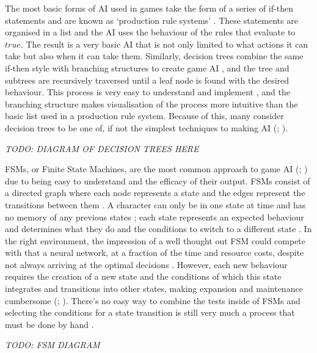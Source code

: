 \documentclass[11pt, a4paper]{article}
\begin{document}
The most basic forms of AI used in games take the form of a series of if-then statements and are known as `production rule systems' \parencite{tozour2002evolution}. These statements are organised in a list and the AI uses the behaviour of the rules that evaluate to $true$. The result is a very basic AI that is not only limited to what actions it can take but also when it can take them. Similarly, decision trees combine the same if-then style with branching structures to create game AI \parencite[62]{nareyek2004ai}, and the tree and subtrees are recursively traversed until a leaf node is found with the desired behaviour. This process is very easy to understand and implement \parencite[295]{millington2019ai}, and the branching structure makes visualisation of the process more intuitive than the basic list used in a production rule system. Because of this, many consider decision trees to be one of, if not the simplest techniques to making AI  (\cite[295]{millington2019ai}; \cite[7]{tozour2002evolution}).

\emph{TODO: DIAGRAM OF DECISION TREES HERE}

FSMs, or Finite State Machines, are the most common approach to game AI (\cite[1]{orkin2006three}; \cite[309]{millington2019ai}) due to being easy to understand and the efficacy of their output. FSMs consist of a directed graph where each node represents a state and the edges represent the transitions between them \parencite[6]{tozour2002evolution}. A character can only be in one state at time and has no memory of any previous states \parencite{colledanchise2014performance}; each state represents an expected behaviour and determines what they do and the conditions to switch to a different state \parencite[3]{diller2004behavior}. In the right environment, the impression of a well thought out FSM could compete with that a neural network, at a fraction of the time and resource costs, despite not always arriving at the optimal decisions \parencite{sweetser2002current}. However, each new behaviour requires the creation of a new state and the conditions of which this state integrates and transitions into other states, making expansion and maintenance cumbersome (\cite[2]{sweetser2002current}; \cite[3]{lim2010evolving}). There's no easy way to combine the tests inside of FSMs and selecting the conditions for a state transition is still very much a process that must be done by hand \parencite[313]{millington2019ai}. 

\emph{TODO: FSM DIAGRAM}
\end{document}

